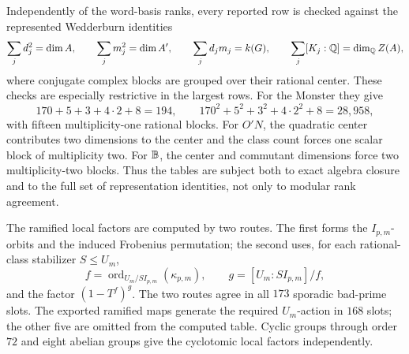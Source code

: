 Independently of the word-basis ranks, every reported row is checked against
the represented Wedderburn identities
\[
 \sum_jd_j^2=\dim A,\qquad
 \sum_jm_j^2=\dim A',\qquad
 \sum_jd_jm_j=k(G),\qquad
 \sum_j[K_j:\mathbb Q]=\dim_\mathbb Q Z(A),
\]
where conjugate complex blocks are grouped over their rational center.
These checks are especially restrictive in the largest rows.  For the
Monster they give
\[
 170+5+3+4\cdot2+8=194,\qquad
 170^2+5^2+3^2+4\cdot2^2+8=28{,}958,
\]
with fifteen multiplicity-one rational blocks.  For \(O'N\), the quadratic
center contributes two dimensions to the center and the class count forces
one scalar block of multiplicity two.  For \(\mathbb B\), the center and commutant
dimensions force two multiplicity-two blocks.  Thus the tables are
subject both to exact algebra closure and to the full set of representation
identities, not only to modular rank agreement.

The ramified local factors are computed by two routes.  The first forms the
\(I_{p,m}\)-orbits and the induced Frobenius permutation; the second uses,
for each rational-class stabilizer \(S\leq U_m\),
\[
 f=\operatorname{ord}_{U_m/SI_{p,m}}(\kappa_{p,m}),\qquad
 g=[U_m:SI_{p,m}]/f,
\]
and the factor \((1-T^f)^g\).  The two routes agree in all \(173\)
sporadic bad-prime slots.  The exported ramified maps generate the required
\(U_m\)-action in \(168\) slots; the other five are omitted from the
computed table.  Cyclic groups through order \(72\) and eight abelian
groups give the cyclotomic local factors independently.
